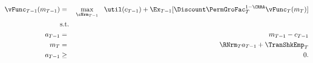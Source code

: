 \begin{eqnarray*}
{\vFunc}_{T-1}({m}_{T-1}) & = & \max_{\cNrm_{T-1}} ~~ \util({c}_{T-1}) + \Ex_{T-1} [\Discount \PermGroFac_{T}^{1-\CRRA}{\vFunc}_{T}({m}_{T})] \label{eq:ConstrArt}
\\ & \mbox{s.t.}&  \nonumber
\\ {a}_{T-1} & = & {m}_{T-1} - {c}_{T-1}
\\ {m}_{T} & = & \RNrm_{T} {a}_{T-1} + \TranShkEmp_{T}
\\ {a}_{T-1} & \geq & 0 .
\end{eqnarray*}
